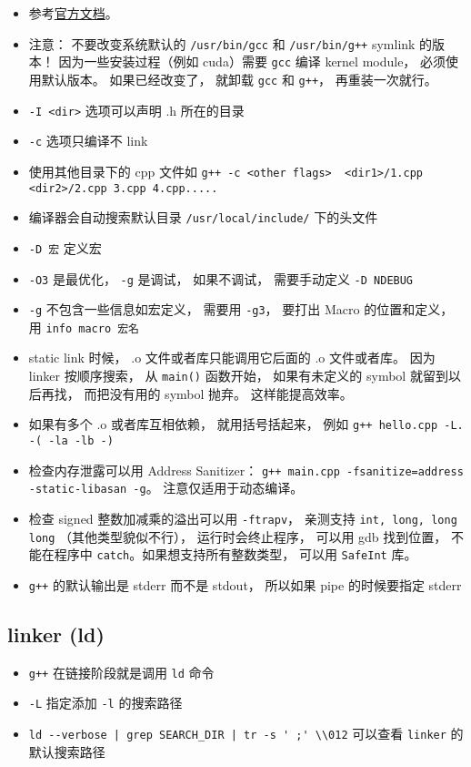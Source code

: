 
\begin{issues}
\issueDraft
\end{issues}


\begin{itemize}
\item 参考\href{https://gcc.gnu.org/onlinedocs/gcc-12.2.0/gcc/}{官方文档}。
\item 注意： 不要改变系统默认的 \verb|/usr/bin/gcc| 和 \verb|/usr/bin/g++| symlink 的版本！ 因为一些安装过程（例如 cuda）需要 \verb|gcc| 编译 kernel module， 必须使用默认版本。 如果已经改变了， 就卸载 \verb|gcc| 和 \verb|g++|， 再重装一次就行。
\item \verb|-I <dir>| 选项可以声明 .h 所在的目录
\item \verb|-c| 选项只编译不 link
\item 使用其他目录下的 cpp 文件如 \verb|g++ -c <other flags>  <dir1>/1.cpp <dir2>/2.cpp 3.cpp 4.cpp.....|
\item 编译器会自动搜索默认目录 \verb|/usr/local/include/| 下的头文件
\item \verb|-D 宏| 定义宏
\item \verb|-O3| 是最优化， \verb|-g| 是调试， 如果不调试， 需要手动定义 \verb|-D NDEBUG|
\item \verb|-g| 不包含一些信息如宏定义， 需要用 \verb|-g3|， 要打出 Macro 的位置和定义， 用 \verb|info macro 宏名|
\item static link 时候， .o 文件或者库只能调用它后面的 .o 文件或者库。 因为 linker 按顺序搜索， 从 \verb|main()| 函数开始， 如果有未定义的 symbol 就留到以后再找， 而把没有用的 symbol 抛弃。 这样能提高效率。
\item 如果有多个 .o 或者库互相依赖， 就用括号括起来， 例如 \verb|g++ hello.cpp -L. -( -la -lb -)|
\item 检查内存泄露可以用 Address Sanitizer： \verb|g++ main.cpp -fsanitize=address -static-libasan -g|。 注意仅适用于动态编译。
\item 检查 signed 整数加减乘的溢出可以用 \verb|-ftrapv|， 亲测支持 \verb|int, long, long long| （其他类型貌似不行）， 运行时会终止程序， 可以用 gdb 找到位置， 不能在程序中 \verb|catch|。如果想支持所有整数类型， 可以用 \verb|SafeInt| 库。
\item \verb|g++| 的默认输出是 stderr 而不是 stdout， 所以如果 pipe 的时候要指定 stderr
\end{itemize}

\subsection{linker (ld)}
\begin{itemize}
\item \verb|g++| 在链接阶段就是调用 \verb|ld| 命令
\item \verb|-L| 指定添加 \verb|-l| 的搜索路径
\item \verb`ld --verbose | grep SEARCH_DIR | tr -s ' ;' \\012` 可以查看 \verb|linker| 的默认搜索路径
\end{itemize}

